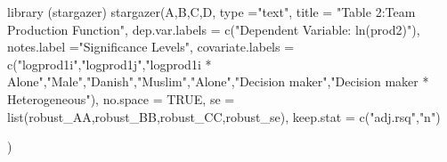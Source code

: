 \documentclass[
]{article}
\newenvironment{Shaded}{\begin{snugshade}}{\end{snugshade}}
\newcommand{\AttributeTok}[1]{\textcolor[rgb]{0.77,0.63,0.00}{#1}}
\newcommand{\ConstantTok}[1]{\textcolor[rgb]{0.00,0.00,0.00}{#1}}
\newcommand{\FunctionTok}[1]{\textcolor[rgb]{0.00,0.00,0.00}{#1}}
\newcommand{\NormalTok}[1]{#1}
\newcommand{\StringTok}[1]{\textcolor[rgb]{0.31,0.60,0.02}{#1}}
\begin{document}
\begin{Shaded}
\begin{Highlighting}[]
\FunctionTok{library}\NormalTok{ (stargazer)}
\FunctionTok{stargazer}\NormalTok{(A,B,C,D, }\AttributeTok{type =}\StringTok{"text"}\NormalTok{,}
          \AttributeTok{title =} \StringTok{"Table 2:Team Production Function"}\NormalTok{,}
          \AttributeTok{dep.var.labels =} \FunctionTok{c}\NormalTok{(}\StringTok{"Dependent Variable: ln(prod2)"}\NormalTok{),}
          \AttributeTok{notes.label =}\StringTok{"Significance Levels"}\NormalTok{,}
          \AttributeTok{covariate.labels =} \FunctionTok{c}\NormalTok{(}\StringTok{"logprod1i"}\NormalTok{,}\StringTok{"logprod1j"}\NormalTok{,}\StringTok{"logprod1i * Alone"}\NormalTok{,}\StringTok{"Male"}\NormalTok{,}\StringTok{"Danish"}\NormalTok{,}\StringTok{"Muslim"}\NormalTok{,}\StringTok{"Alone"}\NormalTok{,}\StringTok{"Decision maker"}\NormalTok{,}\StringTok{"Decision maker *}
\StringTok{                               Heterogeneous"}\NormalTok{),}
          \AttributeTok{no.space =} \ConstantTok{TRUE}\NormalTok{,}
          \AttributeTok{se =} \FunctionTok{list}\NormalTok{(robust\_AA,robust\_BB,robust\_CC,robust\_se),}
          \AttributeTok{keep.stat =} \FunctionTok{c}\NormalTok{(}\StringTok{"adj.rsq"}\NormalTok{,}\StringTok{"n"}\NormalTok{)}
          
\NormalTok{          )}
\end{Highlighting}
\end{Shaded}
\end{document}
